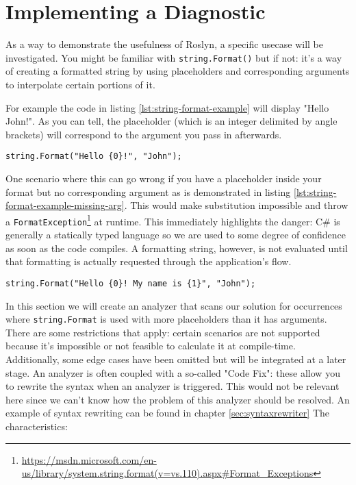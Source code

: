 \chapter{Implementing a Diagnostic}
\label{ch:diagnostic}

As a way to demonstrate the usefulness of Roslyn, a specific usecase will be investigated. You might be familiar with \texttt{string.Format()} but if not: it's a way of creating a formatted string by using placeholders and corresponding arguments to interpolate certain portions of it.

For example the code in listing \ref{lst:string-format-example} will display "Hello John!". As you can tell, the placeholder (which is an integer delimited by angle brackets) will correspond to the argument you pass in afterwards.

\begin{lstlisting}[label={lst:string-format-example}]
string.Format("Hello {0}!", "John");
\end{lstlisting}

One scenario where this can go wrong if you have a placeholder inside your format but no corresponding argument as is demonstrated in listing \ref{lst:string-format-example-missing-arg}. This would make substitution impossible and throw a \texttt{FormatException}\footnote{\url{https://msdn.microsoft.com/en-us/library/system.string.format(v=vs.110).aspx\#Format_Exceptions}} at runtime. This immediately highlights the danger: C\# is generally a statically typed language so we are used to some degree of confidence as soon as the code compiles. A formatting string, however, is not evaluated until that formatting is actually requested through the application's flow. 

\begin{lstlisting}[label={lst:string-format-example-missing-arg}]
string.Format("Hello {0}! My name is {1}", "John");
\end{lstlisting}

In this section we will create an analyzer that scans our \gls{solution} for occurrences where \texttt{string.Format} is used with more placeholders than it has arguments. 
There are some restrictions that apply: certain scenarios are not supported because it's impossible or not feasible to calculate it at compile-time. Additionally, some edge cases have been omitted but will be integrated at a later stage. An analyzer is often coupled with a so-called "Code Fix": these allow you to rewrite the \gls{syntax} when an analyzer is triggered. This would not be relevant here since we can't know how the problem of this analyzer should be resolved. An example of syntax rewriting can be found in chapter \ref{sec:syntaxrewriter} The characteristics:

